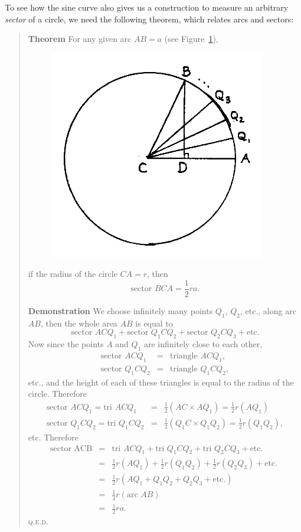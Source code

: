 \documentclass[twoside,openright]{article}
\newlength{\oldjot}
\begin{document}
To see how the sine curve also gives us a construction to measure an
arbitrary {\em sector} of a circle, we need the following theorem,
which relates arcs and sectors:
\begin{quote} {\bf Theorem} \hspace{1ex}\label{secarea} For any given
  arc $AB =a$ (see Figure~\ref{sector}),
  \begin{figure}[htp]
    \begin{center}
      \includegraphics[width=.5\textwidth]{fig/Figure59}
      \caption{}
      \label{sector}
      \vspace{-10pt}
    \end{center}
  \end{figure}
  if the radius of the circle $CA =r$, then
$$\mbox{sector }BCA = \frac{1}{2}ra.$$

{\bf Demonstration} \hspace{1ex} We choose infinitely many points
$Q_1$, $Q_2$, etc., along arc $AB$, then the whole area $AB$ is equal
to
$$\mbox{sector }ACQ_1 + \mbox{sector }Q_1CQ_2 + \mbox{sector }Q_2CQ_3 + \mbox{etc.}$$
Now since the points $A$ and $Q_1$ are infinitely close to each other,
\begin{eqnarray*}
  \mbox{sector }ACQ_1 & = & \mbox{triangle }ACQ_1,\\
  \mbox{sector }Q_1CQ_2 & = & \mbox{triangle }Q_1CQ_2,
\end{eqnarray*}
etc., and the height of each of these triangles is equal to the radius
of the circle.  Therefore \setlength{\jot}{1.5ex}
\begin{eqnarray*}
  \mbox{sector }ACQ_1 = \mbox{tri }ACQ_1 & = & \frac{1}{2}(AC \times AQ_1) = \frac{1}{2}r(AQ_1)\\
  \mbox{sector }Q_1CQ_2 = \mbox{tri }Q_1CQ_2 & = & \frac{1}{2}(Q_1C \times Q_1Q_2) = \frac{1}{2}r(Q_1Q_2),
\end{eqnarray*}
etc.  Therefore
\begin{eqnarray*}
  \mbox{sector ACB} & = & \mbox{tri }ACQ_1 + \mbox{tri }Q_1CQ_2 + \mbox{tri }Q_2CQ_3 + \mbox{etc.}\\
                    & = & \frac{1}{2}r(AQ_1) + \frac{1}{2}r(Q_1Q_2) + \frac{1}{2}r(Q_2Q_3) + \mbox{etc. }\\
                    & = & \frac{1}{2}r(AQ_1 + Q_1Q_2 + Q_2Q_3 + \mbox{etc.})\\
                    & = & \frac{1}{2}r(\mbox{arc }AB)\\
                    & = & \frac{1}{2}ra.
\end{eqnarray*}
\setlength{\jot}{\oldjot} \textsc{q.e.d.}
\end{quote}
\end{document}
